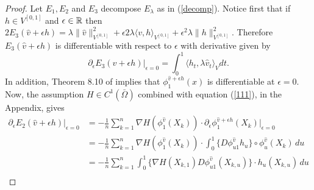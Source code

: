 \documentclass[noinfoline]{imsart}
\begin{document}
\begin{proof} 
Let $E_1, E_2$ and $E_3$ decompose $E_\lambda$ as in (\ref{decomp}). Notice first that if  $h\in V^{[0,1]}$  and $\epsilon \in \Bbb R$ then $2 E_3(\hat v+\epsilon h) = {\lambda}\| \hat v \|^2_{V^{[0,1]}} + \epsilon 2 \lambda\langle v,h \rangle_{V^{[0,1]}}  +\epsilon^2{\lambda}\| h \|^2_{V^{[0,1]}} $. Therefore $E_3(\hat v+\epsilon h)$ is differentiable with respect to $\epsilon$ with derivative given by
\begin{equation}
 \label{dderE1}
{\partial_\epsilon}  E_3(\hat v+\epsilon h)\bigr|_{\epsilon=0}
=  \int_0^1 \langle h_t,\lambda \hat v_t \rangle_V dt.
\end{equation}
In addition, Theorem 8.10 of \cite{you:10}
 implies that  $\phi^{\hat v+\epsilon h}_1(x)$  is differentiable at $\epsilon = 0$. %
Now, the assumption  $H\in C^1(\bar\Omega)$ combined with equation (\ref{111}), in the Appendix, gives %
\begin{align} 
\partial_\epsilon E_2(\hat v+\epsilon h)\bigr|_{\epsilon=0} \nonumber
&= -\frac{1}{n}\sum_{k=1}^n  \nabla H(\phi_1^{\hat v }(X_k)) \cdot {\partial_\epsilon}  \phi^{\hat v+\epsilon h}_{1}(X_k)\bigr|_{\epsilon = 0} \nonumber \\
&= -\frac{1}{n}\sum_{k=1}^n  \nabla H(\phi_1^{\hat v }(X_k)) \cdot \int_0^1  \bigl\{D\phi^{ \hat v}_{u1} h_u \bigr\}\circ{\phi^{ \hat v}_{u}(X_k)}\,   du \nonumber \\
&= -\frac{1}{n}\sum_{k=1}^n \int_0^1  \bigl\{  \nabla H( X_{k,1}) D\phi^{\hat v}_{u1}(X_{k,u}) \bigr\} \cdot  h_u (X_{k,u})\,   du \nonumber \\

\end{align}
\end{proof}
\end{document}
